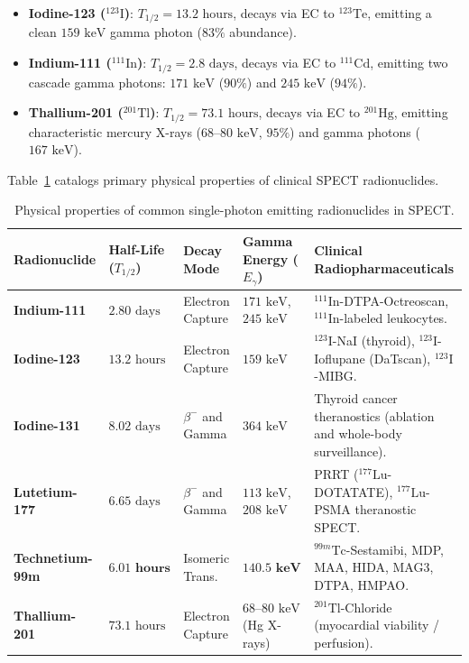 \documentclass[11pt,a4paper]{article}
\begin{document}
\begin{enumerate}[leftmargin=*]
    \begin{itemize}
        \item \textbf{Iodine-123 ($^{123}\text{I}$)}: $T_{1/2} = 13.2\text{ hours}$, decays via EC to $^{123}\text{Te}$, emitting a clean $159\text{ keV}$ gamma photon ($83\%$ abundance).
        \item \textbf{Indium-111 ($^{111}\text{In}$)}: $T_{1/2} = 2.8\text{ days}$, decays via EC to $^{111}\text{Cd}$, emitting two cascade gamma photons: $171\text{ keV}$ ($90\%$) and $245\text{ keV}$ ($94\%$).
        \item \textbf{Thallium-201 ($^{201}\text{Tl}$)}: $T_{1/2} = 73.1\text{ hours}$, decays via EC to $^{201}\text{Hg}$, emitting characteristic mercury X-rays ($68\text{--}80\text{ keV}$, $95\%$) and gamma photons ($167\text{ keV}$).
    \end{itemize}
\end{enumerate}

Table~\ref{tab:spect_isotopes} catalogs primary physical properties of clinical SPECT radionuclides.

\begin{table}[htbp]
\centering
\small
\renewcommand{\arraystretch}{1.25}
\begin{tabular}{p{2.8cm}p{2.2cm}p{2.2cm}p{2.8cm}p{4.5cm}}
\toprule
\textbf{Radionuclide} & \textbf{Half-Life ($T_{1/2}$)} & \textbf{Decay Mode} & \textbf{Gamma Energy ($E_\gamma$)} & \textbf{Clinical Radiopharmaceuticals} \\
\midrule
\textbf{Indium-111} & $2.80\text{ days}$ & Electron Capture & $171\text{ keV}$, $245\text{ keV}$ & $^{111}\text{In}$-DTPA-Octreoscan, $^{111}\text{In}$-labeled leukocytes. \\
\textbf{Iodine-123} & $13.2\text{ hours}$ & Electron Capture & $159\text{ keV}$ & $^{123}\text{I}$-NaI (thyroid), $^{123}\text{I}$-Ioflupane (DaTscan), $^{123}\text{I}$-MIBG. \\
\textbf{Iodine-131} & $8.02\text{ days}$ & $\beta^-$ and Gamma & $364\text{ keV}$ & Thyroid cancer theranostics (ablation and whole-body surveillance). \\
\textbf{Lutetium-177} & $6.65\text{ days}$ & $\beta^-$ and Gamma & $113\text{ keV}$, $208\text{ keV}$ & PRRT ($^{177}\text{Lu}$-DOTATATE), $^{177}\text{Lu}$-PSMA theranostic SPECT. \\
\textbf{Technetium-99m} & $\mathbf{6.01\text{ hours}}$ & Isomeric Trans. & $\mathbf{140.5\text{ keV}}$ & $^{99m}\text{Tc}$-Sestamibi, MDP, MAA, HIDA, MAG3, DTPA, HMPAO. \\
\textbf{Thallium-201} & $73.1\text{ hours}$ & Electron Capture & $68\text{--}80\text{ keV}$ (Hg X-rays) & $^{201}\text{Tl}$-Chloride (myocardial viability / perfusion). \\
\bottomrule
\end{tabular}
\caption{Physical properties of common single-photon emitting radionuclides in SPECT.}
\label{tab:spect_isotopes}
\end{table}
\end{document}
